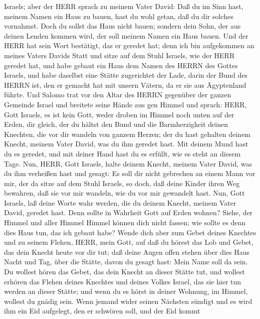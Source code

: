 Israels;  aber der HERR sprach zu meinem Vater David: Daß
du im Sinn hast, meinem Namen ein Haus zu bauen, hast du wohl getan, daß
du dir solches vornahmst.  Doch du sollst das Haus nicht
bauen; sondern dein Sohn, der aus deinen Lenden kommen wird, der soll
meinem Namen ein Haus bauen.  Und der HERR hat sein Wort
bestätigt, das er geredet hat; denn ich bin aufgekommen an meines Vaters
Davids Statt und sitze auf dem Stuhl Israels, wie der HERR geredet hat,
und habe gebaut ein Haus dem Namen des HERRN des Gottes Israels,
 und habe daselbst eine Stätte zugerichtet der Lade, darin
der Bund des HERRN ist, den er gemacht hat mit unsern Vätern, da er sie
aus Ägyptenland führte.  Und Salomo trat vor den Altar des
HERRN gegenüber der ganzen Gemeinde Israel und breitete seine Hände aus
gen Himmel  und sprach: HERR, Gott Israels, es ist kein
Gott, weder droben im Himmel noch unten auf der Erden, dir gleich, der
du hältst den Bund und die Barmherzigkeit deinen Knechten, die vor dir
wandeln von ganzem Herzen;  der du hast gehalten deinem
Knecht, meinem Vater David, was du ihm geredet hast. Mit deinem Mund
hast du es geredet, und mit deiner Hand hast du es erfüllt, wie es steht
an diesem Tage.  Nun, HERR, Gott Israels, halte deinem
Knecht, meinem Vater David, was du ihm verheißen hast und gesagt: Es
soll dir nicht gebrechen an einem Mann vor mir, der da sitze auf dem
Stuhl Israels, so doch, daß deine Kinder ihren Weg bewahren, daß sie vor
mir wandeln, wie du vor mir gewandelt hast.  Nun, Gott
Israels, laß deine Worte wahr werden, die du deinem Knecht, meinem Vater
David, geredet hast.  Denn sollte in Wahrheit Gott auf
Erden wohnen? Siehe, der Himmel und aller Himmel Himmel können dich
nicht fassen; wie sollte es denn dies Haus tun, das ich gebaut habe?
 Wende dich aber zum Gebet deines Knechtes und zu seinem
Flehen, HERR, mein Gott, auf daß du hörest das Lob und Gebet, das dein
Knecht heute vor dir tut;  daß deine Augen offen stehen
über dies Haus Nacht und Tag, über die Stätte, davon du gesagt hast:
Mein Name soll da sein. Du wollest hören das Gebet, das dein Knecht an
dieser Stätte tut,  und wollest erhören das Flehen deines
Knechtes und deines Volkes Israel, das sie hier tun werden an dieser
Stätte; und wenn du es hörst in deiner Wohnung, im Himmel, wollest du
gnädig sein.  Wenn jemand wider seinen Nächsten sündigt und
es wird ihm ein Eid aufgelegt, den er schwören soll, und der Eid kommt
